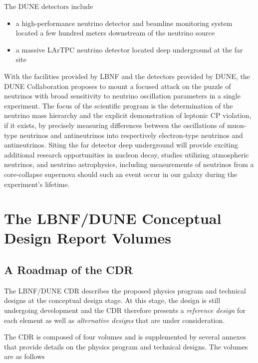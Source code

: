 The DUNE detectors include
\begin{itemize}
\item a high-performance neutrino detector and beamline monitoring system
located a few hundred meters downstream of the neutrino source
\item a massive LArTPC neutrino detector located deep underground at the far site
\end{itemize}

With the facilities provided by LBNF and the detectors
provided by DUNE, the DUNE Collaboration proposes to mount a focused
attack on the puzzle of neutrinos with broad sensitivity to neutrino
oscillation parameters in a single experiment.  The focus of the scientific program is the determination of the neutrino mass hierarchy and the explicit demonstration of leptonic CP violation, if it exists, by precisely measuring differences between the oscillations of muon-type neutrinos and antineutrinos into respectively electron-type neutrinos and antineutrinos. Siting the far detector deep underground will provide exciting additional research opportunities in nucleon decay, studies utilizing atmospheric neutrinos, and neutrino astrophysics, including measurements of neutrinos from a core-collapse supernova should such an event occur in our galaxy during the experiment's lifetime.

\section{The LBNF/DUNE Conceptual Design Report Volumes}

\subsection{A Roadmap of the CDR}

The LBNF/DUNE CDR describes the proposed physics program and 
technical designs at the conceptual design stage.  At this stage, the design is
still undergoing development and the CDR therefore presents a \textit{reference design} 
for each element as well as \textit{alternative designs} that are under consideration.

The CDR is composed of four volumes and is supplemented by several annexes that 
provide details on the physics program and technical designs. The volumes are as follows


